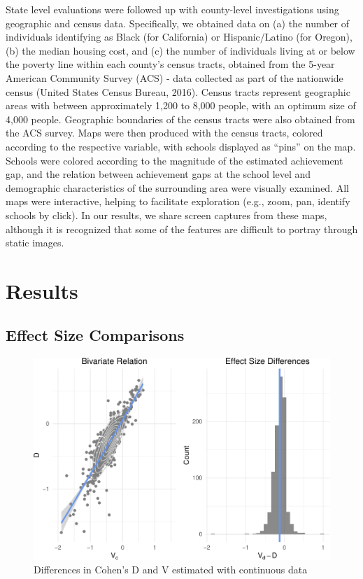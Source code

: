 \documentclass[man, fleqn, noextraspace]{apa6}
\theoremstyle{definition}
\theoremstyle{definition}
\theoremstyle{definition}
\theoremstyle{remark}
\begin{document}
State level evaluations were followed up with county-level
investigations using geographic and census data. Specifically, we
obtained data on (a) the number of individuals identifying as Black (for
California) or Hispanic/Latino (for Oregon), (b) the median housing
cost, and (c) the number of individuals living at or below the poverty
line within each county's census tracts, obtained from the 5-year
American Community Survey (ACS) - data collected as part of the
nationwide census (United States Census Bureau, 2016). Census tracts
represent geographic areas with between approximately 1,200 to 8,000
people, with an optimum size of 4,000 people. Geographic boundaries of
the census tracts were also obtained from the ACS survey. Maps were then
produced with the census tracts, colored according to the respective
variable, with schools displayed as \enquote{pins} on the map. Schools
were colored according to the magnitude of the estimated achievement
gap, and the relation between achievement gaps at the school level and
demographic characteristics of the surrounding area were visually
examined. All maps were interactive, helping to facilitate exploration
(e.g., zoom, pan, identify schools by click). In our results, we share
screen captures from these maps, although it is recognized that some of
the features are difficult to portray through static images.

\hypertarget{results}{%
\section{Results}\label{results}}

\hypertarget{effect-size-comparisons}{%
\subsection{Effect Size Comparisons}\label{effect-size-comparisons}}

\begin{figure}
\centering
\includegraphics{anderson_ncme18_files/figure-latex/unnamed-chunk-1-1.pdf}
\caption{\label{fig:unnamed-chunk-1}Differences in Cohen's D and V estimated
with continuous data}
\end{figure}
\end{document}
